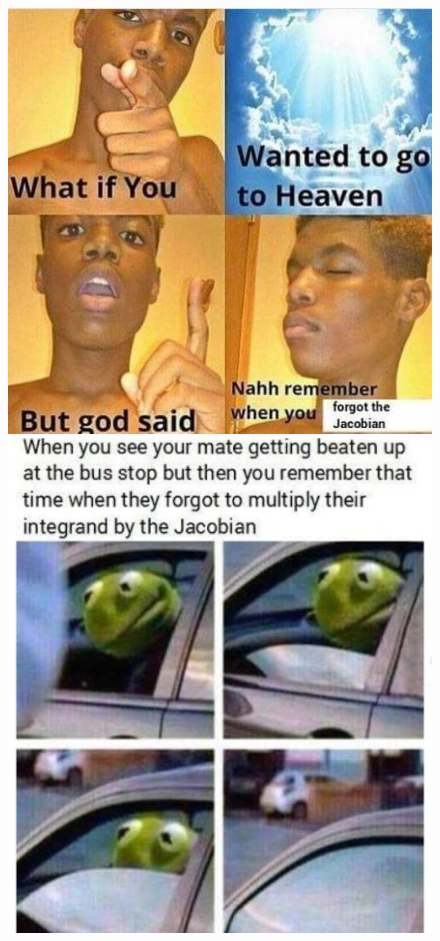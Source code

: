 \documentclass[handout, aspectratio=169]{beamer}
\begin{document}
\begin{frame} 
	\begin{figure}[t]
		\begin{minipage}{0.48\textwidth}
			\centering
			\includegraphics[width=5 cm]{3.jpg}
			
		\end{minipage}
		\begin{minipage}{0.48\textwidth}
			\centering
			\includegraphics[width=5 cm]{6.jpg}
			
		\end{minipage}
	\end{figure}
\end{frame}
\end{document}
